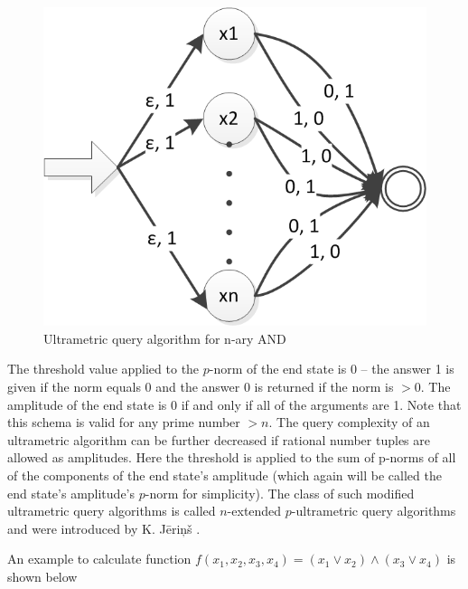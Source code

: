 \documentclass{llncs}
\begin{document}
\begin{figure}
	\centering
	\includegraphics{n-and.png}
	\caption{Ultrametric query algorithm for n-ary AND}
	  \label{n_and}
\end{figure}

The threshold value applied to the $p$-norm of the end state is 0 – the answer 1 is given if the norm equals 0 and the answer 0 is returned if the norm is $>0$. The amplitude of the end state is 0 if and only if all of the arguments are 1. Note that this schema is valid for any prime number $>n$. The query complexity of an ultrametric algorithm can be further decreased if rational number tuples are allowed as amplitudes. Here the threshold is applied to the sum of p-norms of all of the components of the end state's amplitude (which again will be called the end state's amplitude's $p$-norm for simplicity). The class of such modified ultrametric query algorithms is called $n$-extended $p$-ultrametric query algorithms and were introduced by K. J\= eri\c n\v s \cite{Jer12}.

An example to calculate function $f(x_1,x_2,x_3,x_4)=(x_1\vee x_2)\wedge (x_3\vee x_4)$ is shown below %
\end{document}
